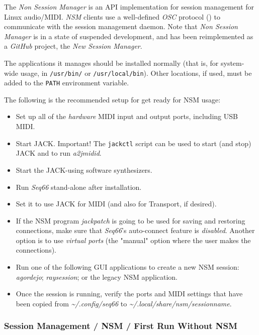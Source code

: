    The \textsl{Non Session Manager} is an API implementation for session
   management for Linux audio/MIDI.
   \textsl{NSM} clients use a well-defined
   \textsl{OSC} protocol (\cite{osc})
   to communicate with the session management daemon.
   Note that \textsl{Non Session Manager} is in a state of suspended
   development, and has been reimplemented as a \textsl{GitHub} project,
   the \textsl{New Session Manager}.

   The applications it manages should be installed normally (that is,
   for system-wide usage, in
   \texttt{/usr/bin/} or \texttt{/usr/local/bin}).
   Other locations, if used, must be added to the \texttt{PATH}
   environment variable.

   The following is the recommended setup for get ready for
   NSM usage:

   \begin{itemize}
      \item Set up all of the \textsl{hardware} MIDI input and output ports,
         including USB MIDI.
      \item Start JACK. Important!
         The \texttt{jackctl} script can be used
         to start (and stop) JACK and to run \textsl{a2jmidid}.
      \item Start the JACK-using software synthesizers.
      \item Run \textsl{Seq66} stand-alone after installation.
      \item Set it to use JACK for MIDI (and also for Transport,
         if desired).
      \item If the NSM program \textsl{jackpatch} is going to be used
         for saving and restoring connections, make sure that
         \textsl{Seq66}'s auto-connect feature is \textsl{disabled}.
         Another option is to use \textsl{virtual ports} (the "manual" option
         where the user makes the connections).
      \item Run one of the following GUI applications to create a
         new NSM session: \textsl{agordejo}; \textsl{raysession}; or
         the legacy NSM application.
      \item Once the session is running, verify the ports and MIDI
         settings that have been copied from
         \textsl{\textasciitilde/.config/seq66} to
         \textsl{\textasciitilde/.local/share/nsm/sessionname}.
   \end{itemize}

\subsubsection{Session Management / NSM / First Run Without NSM}
\label{subsec:sessions_nsm_first_run_without_nsm}

